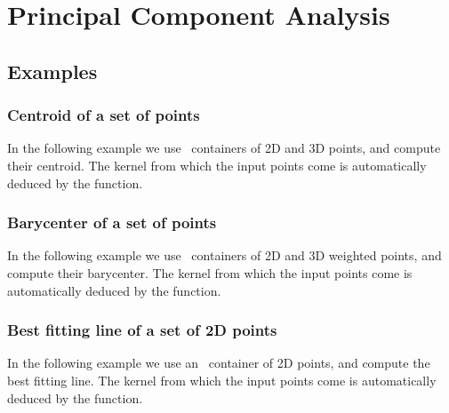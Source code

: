 \chapter{Principal Component Analysis}
\label{chap:pca}


\minitoc


% 

\section{Examples}
\label{subsec:pca_examples}

\subsection{Centroid of a set of points}

In the following example we use \stl\ containers of 2D and 3D points, and
compute their centroid. The kernel from which the input points
come is automatically deduced by the function.


\subsection{Barycenter of a set of points}

In the following example we use \stl\ containers of 2D and 3D weighted points,
and compute their barycenter. The kernel from which the input points come is
automatically deduced by the function.


\subsection{Best fitting line of a set of 2D points}

In the following example we use an \stl\ container of 2D points, and
compute the best fitting line. The kernel from which the input points
come is automatically deduced by the function.


